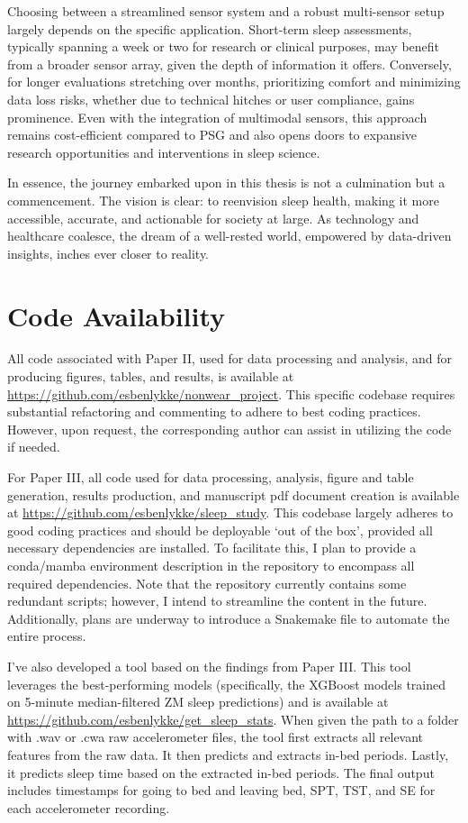 \documentclass[
  10pt,
]{scrbook}
\begin{document}
Choosing between a streamlined sensor system and a robust multi-sensor
setup largely depends on the specific application. Short-term sleep
assessments, typically spanning a week or two for research or clinical
purposes, may benefit from a broader sensor array, given the depth of
information it offers. Conversely, for longer evaluations stretching
over months, prioritizing comfort and minimizing data loss risks,
whether due to technical hitches or user compliance, gains prominence.
Even with the integration of multimodal sensors, this approach remains
cost-efficient compared to PSG and also opens doors to expansive
research opportunities and interventions in sleep science.

In essence, the journey embarked upon in this thesis is not a
culmination but a commencement. The vision is clear: to reenvision sleep
health, making it more accessible, accurate, and actionable for society
at large. As technology and healthcare coalesce, the dream of a
well-rested world, empowered by data-driven insights, inches ever closer
to reality.

\hypertarget{code-availability}{%
\chapter{Code Availability}\label{code-availability}}

All code associated with Paper II, used for data processing and
analysis, and for producing figures, tables, and results, is available
at \url{https://github.com/esbenlykke/nonwear_project}. This specific
codebase requires substantial refactoring and commenting to adhere to
best coding practices. However, upon request, the corresponding author
can assist in utilizing the code if needed.

For Paper III, all code used for data processing, analysis, figure and
table generation, results production, and manuscript pdf document
creation is available at
\url{https://github.com/esbenlykke/sleep_study}. This codebase largely
adheres to good coding practices and should be deployable `out of the
box', provided all necessary dependencies are installed. To facilitate
this, I plan to provide a conda/mamba environment description in the
repository to encompass all required dependencies. Note that the
repository currently contains some redundant scripts; however, I intend
to streamline the content in the future. Additionally, plans are
underway to introduce a Snakemake file to automate the entire process.

I've also developed a tool based on the findings from Paper III. This
tool leverages the best-performing models (specifically, the XGBoost
models trained on 5-minute median-filtered ZM sleep predictions) and is
available at \url{https://github.com/esbenlykke/get_sleep_stats}. When
given the path to a folder with .wav or .cwa raw accelerometer files,
the tool first extracts all relevant features from the raw data. It then
predicts and extracts in-bed periods. Lastly, it predicts sleep time
based on the extracted in-bed periods. The final output includes
timestamps for going to bed and leaving bed, SPT, TST, and SE for each
accelerometer recording.
\end{document}
